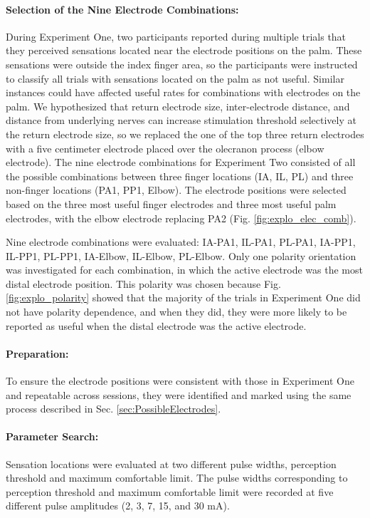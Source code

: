 \documentclass[10pt]{iopart}
\begin{document}
\paragraph{Selection of the Nine Electrode Combinations:}
During Experiment One, two participants reported during multiple trials that they perceived sensations located near the electrode positions on the palm. These sensations were outside the index finger area, so the participants were instructed to classify all trials with sensations located on the palm as not useful. Similar instances could have affected useful rates for combinations with electrodes on the palm. We hypothesized that return electrode size, inter-electrode distance, and distance from underlying nerves can increase stimulation threshold selectively at the return electrode size, so we replaced the one of the top three return electrodes with a five centimeter electrode placed over the olecranon process (elbow electrode). The nine electrode combinations for Experiment Two consisted of all the possible combinations between three finger locations (IA, IL, PL) and three non-finger locations (PA1, PP1, Elbow). The electrode positions were selected based on the three most useful finger electrodes and three most useful palm electrodes, with the elbow electrode replacing PA2 (Fig. \ref{fig:explo_elec_comb}).

Nine electrode combinations were evaluated: IA-PA1, IL-PA1, PL-PA1, IA-PP1, IL-PP1, PL-PP1, IA-Elbow, IL-Elbow, PL-Elbow. Only one polarity orientation was investigated for each combination, in which the active electrode was the most distal electrode position. This polarity was chosen because Fig. \ref{fig:explo_polarity} showed that the majority of the trials in Experiment One did not have polarity dependence, and when they did, they were more likely to be reported as useful when the distal electrode was the active electrode.

\paragraph{Preparation:} To ensure the electrode positions were consistent with those in Experiment One and repeatable across sessions, they were identified and marked using the same process described in Sec. \ref{sec:PossibleElectrodes}.

\paragraph{Parameter Search:} Sensation locations were evaluated at two different pulse widths, perception threshold and maximum comfortable limit. The pulse widths corresponding to perception threshold and maximum comfortable limit were recorded at five different pulse amplitudes (2, 3, 7, 15, and 30 mA). 
\end{document}
